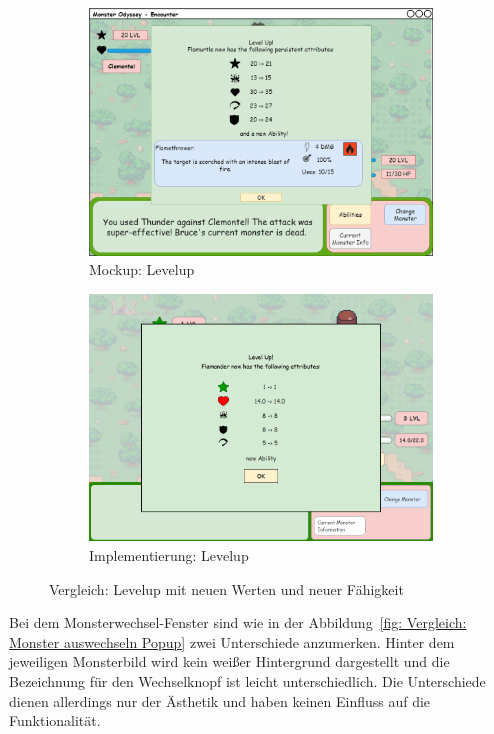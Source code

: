 \begin{figure}[H]
    \centering
    \begin{subfigure}[b]{0.4\textwidth}
        \includegraphics[width=\textwidth]{images/mockups/Encounter/Encounter1v1AbilitiesUsedWonLevelUp.png}
        \caption{Mockup: Levelup}
        \label{fig: Mockup: Levelup mit neuen Werten und neuer Fähigkeit}
    \end{subfigure}
    \hfill
    \begin{subfigure}[b]{0.4\textwidth}
        \includegraphics[width=\textwidth]{images/implementation/Encounter/Levelupmitneuerability.PNG}
        \caption{Implementierung: Levelup}
        \label{fig: Implementierung: Levelup mit neuen Werten und neuer Fähigkeit}
    \end{subfigure}
    \caption{Vergleich: Levelup mit neuen Werten und neuer Fähigkeit}
    \label{fig: Vergleich: Levelup mit neuen Werten und neuer Fähigkeit}
\end{figure}
Bei dem Monsterwechsel-Fenster sind wie in der Abbildung~\ref{fig: Vergleich: Monster auswechseln Popup} zwei Unterschiede anzumerken. Hinter dem jeweiligen Monsterbild wird kein weißer Hintergrund dargestellt und die Bezeichnung für den Wechselknopf ist leicht unterschiedlich. Die Unterschiede dienen allerdings nur der Ästhetik und haben keinen Einfluss auf die Funktionalität.

